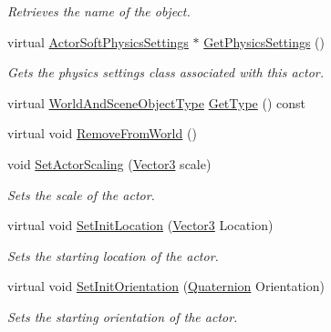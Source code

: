 \begin{DoxyCompactItemize}
\begin{DoxyCompactList}\small\item\em Retrieves the name of the object. \item\end{DoxyCompactList}\item 
virtual \hyperlink{classMezzanine_1_1ActorSoftPhysicsSettings}{ActorSoftPhysicsSettings} $\ast$ \hyperlink{classMezzanine_1_1ActorSoft_a9d2960eee35ecfefe76fce2dde3ea18e}{GetPhysicsSettings} ()
\begin{DoxyCompactList}\small\item\em Gets the physics settings class associated with this actor. \item\end{DoxyCompactList}\item 
virtual \hyperlink{namespaceMezzanine_ae8cd04f706f4998be62f454b7119c718}{WorldAndSceneObjectType} \hyperlink{classMezzanine_1_1ActorSoft_adddd9e4dafbe78aa9fb55ab92a42dc42}{GetType} () const 
\item 
virtual void \hyperlink{classMezzanine_1_1ActorSoft_ac1c30677a8be15080ba7bbdbf7ce696e}{RemoveFromWorld} ()
\item 
void \hyperlink{classMezzanine_1_1ActorSoft_ab76bcb0d227374ef5d69878783c7f89b}{SetActorScaling} (\hyperlink{classMezzanine_1_1Vector3}{Vector3} scale)
\begin{DoxyCompactList}\small\item\em Sets the scale of the actor. \item\end{DoxyCompactList}\item 
virtual void \hyperlink{classMezzanine_1_1ActorSoft_a45178fcaf06a81e75d7d81b8fc90fc9e}{SetInitLocation} (\hyperlink{classMezzanine_1_1Vector3}{Vector3} Location)
\begin{DoxyCompactList}\small\item\em Sets the starting location of the actor. \item\end{DoxyCompactList}\item 
virtual void \hyperlink{classMezzanine_1_1ActorSoft_a8ee3cce8eb7578cdeb2af771f16ab240}{SetInitOrientation} (\hyperlink{classMezzanine_1_1Quaternion}{Quaternion} Orientation)
\begin{DoxyCompactList}\small\item\em Sets the starting orientation of the actor. \item\end{DoxyCompactList}\item 

\end{DoxyCompactItemize}
